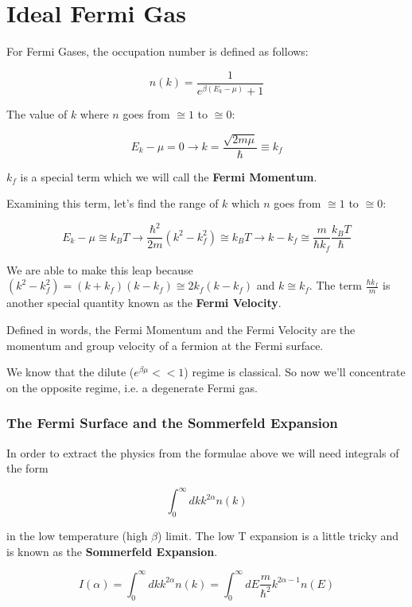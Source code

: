 \documentclass{article}
\newcommand{\bltz}{k_{B}}
\begin{document}
\section{Ideal Fermi Gas}

For Fermi Gases, the occupation number is defined as follows:

$$n(k)=\frac{1}{e^{\beta(E_{k}-\mu)}+1}$$


The value of $k$ where $n$ goes from $\cong 1$ to $\cong 0$:

$$E_{k}-\mu=0\rightarrow k=\frac{\sqrt{2m\mu}}{\hbar}\equiv k_{f}$$

$k_{f}$ is a special term which we will call the \textbf{Fermi Momentum}.

Examining this term, let's find the range of $k$ which $n$ goes from $\cong1$ to $\cong0$:

$$E_{k}-\mu\cong\bltz T\rightarrow\frac{\hbar^{2}}{2m}(k^{2}-k_{f}^{2})\cong\bltz T\rightarrow k-k_{f}\cong\frac{m}{\hbar k_{f}}\frac{\bltz T}{\hbar}$$

We are able to make this leap because $(k^{2}-k_{f}^{2})=(k+k_{f})(k-k_{f})\cong2k_{f}(k-k_{f})$ and $k\cong k_{f}$.  The term $\frac{\hbar k_{f}}{m}$ is another special quantity known as the \textbf{Fermi Velocity}.

Defined in words, the Fermi Momentum and the Fermi Velocity are the momentum and group velocity of a fermion at the Fermi surface.  

We know that the dilute ($e^{\beta\mu}<<1$) regime is classical.  So now we'll concentrate on the opposite regime, i.e. a degenerate Fermi gas.

\subsubsection{The Fermi Surface and the Sommerfeld Expansion}


In order to extract the physics from the formulae above we will need integrals of the form

$$\int_{0}^{\infty}dkk^{2\alpha}n(k)$$

in the low temperature (high $\beta$) limit.  The low T expansion is a little tricky and is known as the \textbf{Sommerfeld Expansion}.  

$$I(\alpha)=\int_{0}^{\infty}dkk^{2\alpha}n(k)=\int_{0}^{\infty}dE\frac{m}{\hbar^{2}}k^{2\alpha-1}n(E)$$
\end{document}
